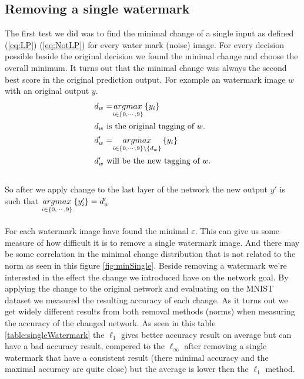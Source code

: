 \documentclass[a4paper]{easychair}
\begin{document}
\subsection{Removing a single watermark}
The first test we did was to find the minimal change of a single input as defined (\ref{eq:LP}) (\ref{eq:NotLP}) for every water mark (noise) image. For every decision possible beside the original decision we found the minimal change and choose the overall minimum. It turns out that the minimal change was always the second best score in the original prediction output. For example an watermark image $w$ with an original output $y$.
\\
\begin{align*}
d_w=&\underset{i\in\left\lbrace 0,\cdots,9\right\rbrace}{argmax}\left\lbrace y_i\right\rbrace \\
\intertext{$d_w$ is the original tagging of $w$.}
d'_w=&\underset{i\in\left\lbrace 0,\cdots,9\right\rbrace\setminus\left\lbrace d_w\right\rbrace}{argmax}\left\lbrace y_i\right\rbrace \\
\intertext{$d'_w$ will be the new tagging of $w$.}
\end{align*}
\\
So after we apply change to the last layer of the network the new output $y'$ is such that $\underset{i\in\left\lbrace 0,\cdots,9\right\rbrace}{argmax}\left\lbrace y'_i\right\rbrace=d'_w$
\\\\
For each watermark image have found the minimal $\varepsilon$. This can give us some measure of how difficult it is to remove a single watermark image. And there may be some correlation in the minimal change distribution that is not related to the norm as seen in this figure \ref{fig:minSingle}. Beside removing a watermark we're interested in the effect the change we introduced have on the network goal. By applying the change to the original network and evaluating on the MNIST dataset we measured the resulting accuracy of each change. As it turns out we get widely different results from both removal methods (norms) when measuring the accuracy of the changed network. As seen in this table \ref{table:singleWatermark} the $\ell_1$ gives better accuracy result on average but can have a bad accuracy result, compered to the $\ell_\infty$ after removing a single watermark that have a consistent result (there minimal accuracy and the maximal accuracy are quite close) but the average is lower then the $\ell_1$ method.
\\\\
\end{document}
